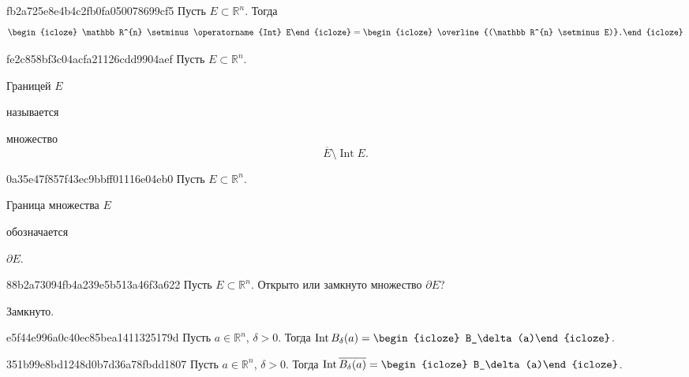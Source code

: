 \begin{note}{fb2a725e8e4b4c2fb0fa050078699cf5}
    Пусть \({ E \subset \mathbb R^{n} }\).
    Тогда
    \[
        \begin{icloze}{2}\mathbb R^{n} \setminus \operatorname{Int} E\end{icloze} = \begin{icloze}{1}\overline{(\mathbb R^{n} \setminus E)}.\end{icloze}
    \]
\end{note}

\begin{note}{fe2c858bf3c04acfa21126cdd9904aef}
    Пусть \({ E \subset \mathbb R^{n} }\).
    \begin{icloze}{2}Границей \({ E }\)\end{icloze} называется \begin{icloze}{1}
        множество
        \[
            \overline{E} \setminus \operatorname{Int} E.
        \]
    \end{icloze}
\end{note}

\begin{note}{0a35e47f857f43ec9bbff01116e04eb0}
    Пусть \({ E \subset \mathbb R^{n} }\).
    \begin{icloze}{1}Граница множества \({ E }\)\end{icloze} обозначается \begin{icloze}{2}\({ \partial E }\).\end{icloze}
\end{note}

\begin{note}{88b2a73094fb4a239e5b513a46f3a622}
    Пусть \({ E \subset \mathbb R^{n} }\).
    Открыто или замкнуто множество \({ \partial E }\)?

    \begin{cloze}{1}
        Замкнуто.
    \end{cloze}
\end{note}

\begin{note}{e5f44e996a0c40ec85bea1411325179d}
    Пусть \({ a \in \mathbb R^{n} }\),\: \({ \delta > 0 }\).
    Тогда \({ \operatorname{Int} B_\delta (a) = \begin{icloze}{1}B_\delta (a)\end{icloze} }\).
\end{note}

\begin{note}{351b99e8bd1248d0b7d36a78fbdd1807}
    Пусть \({ a \in \mathbb R^{n} }\),\: \({ \delta > 0 }\).
    Тогда \({ \operatorname{Int} \overline{B_\delta (a)} = \begin{icloze}{1}B_\delta(a)\end{icloze} }\).
\end{note}

